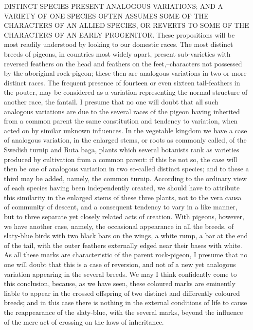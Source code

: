 DISTINCT SPECIES PRESENT ANALOGOUS VARIATIONS; AND A VARIETY OF ONE SPECIES OFTEN ASSUMES SOME OF THE CHARACTERS OF AN ALLIED SPECIES, OR REVERTS TO SOME OF THE CHARACTERS OF AN EARLY PROGENITOR.
These propositions will be most readily understood by looking to our domestic races. The most distinct breeds of pigeons, in countries most widely apart, present sub-varieties with reversed feathers on the head and feathers on the feet,--characters not possessed by the aboriginal rock-pigeon; these then are analogous variations in two or more distinct races. The frequent presence of fourteen or even sixteen tail-feathers in the pouter, may be considered as a variation representing the normal structure of another race, the fantail. I presume that no one will doubt that all such analogous variations are due to the several races of the pigeon having inherited from a common parent the same constitution and tendency to variation, when acted on by similar unknown influences. In the vegetable kingdom we have a case of analogous variation, in the enlarged stems, or roots as commonly called, of the Swedish turnip and Ruta baga, plants which several botanists rank as varieties produced by cultivation from a common parent: if this be not so, the case will then be one of analogous variation in two so-called distinct species; and to these a third may be added, namely, the common turnip. According to the ordinary view of each species having been independently created, we should have to attribute this similarity in the enlarged stems of these three plants, not to the vera causa of community of descent, and a consequent tendency to vary in a like manner, but to three separate yet closely related acts of creation.
With pigeons, however, we have another case, namely, the occasional appearance in all the breeds, of slaty-blue birds with two black bars on the wings, a white rump, a bar at the end of the tail, with the outer feathers externally edged near their bases with white. As all these marks are characteristic of the parent rock-pigeon, I presume that no one will doubt that this is a case of reversion, and not of a new yet analogous variation appearing in the several breeds. We may I think confidently come to this conclusion, because, as we have seen, these coloured marks are eminently liable to appear in the crossed offspring of two distinct and differently coloured breeds; and in this case there is nothing in the external conditions of life to cause the reappearance of the slaty-blue, with the several marks, beyond the influence of the mere act of crossing on the laws of inheritance.
